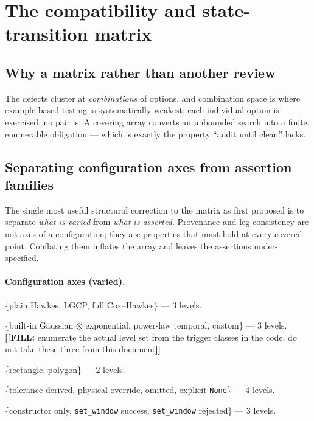 \documentclass[11pt]{article}
\newcommand{\fillanchor}[1]{{\color{red}\textbf{[[FILL:} #1\textbf{]]}}}
\renewcommand{\tt}[1]{\texttt{#1}}
\begin{document}
\section{The compatibility and state-transition matrix}

\subsection{Why a matrix rather than another review}

The defects cluster at \emph{combinations} of options, and combination space is where
example-based testing is systematically weakest: each individual option is exercised, no
pair is. A covering array converts an unbounded search into a finite, enumerable
obligation --- which is exactly the property ``audit until clean'' lacks.

\subsection{Separating configuration axes from assertion families}

The single most useful structural correction to the matrix as first proposed is to
separate \emph{what is varied} from \emph{what is asserted}. Provenance and leg
consistency are not axes of a configuration; they are properties that must hold at every
covered point. Conflating them inflates the array and leaves the assertions
under-specified.

\paragraph{Configuration axes (varied).}
\begin{description}[leftmargin=2.6em,style=nextline,font=\normalfont\bfseries]
  \item[C1 Model family] \{plain Hawkes, LGCP, full Cox--Hawkes\} --- 3 levels.
  \item[C2 Trigger specification] \{built-in Gaussian $\otimes$ exponential, power-law
  temporal, custom\} --- 3 levels.
  \fillanchor{enumerate the actual level set from the trigger classes in the code; do not
  take these three from this document}
  \item[C3 Excitation support mode] \{rectangle, polygon\} --- 2 levels.
  \item[C4 Cutoff input] \{tolerance-derived, physical override, omitted, explicit
  \tt{None}\} --- 4 levels.
  \item[C5 State path] \{constructor only, \tt{set\_window} success, \tt{set\_window}
  rejected\} --- 3 levels.
\end{description}
\end{document}
